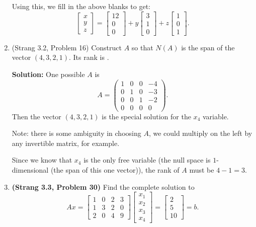 \documentclass[11pt]{article}
\begin{document}
\begin{enumerate}
Using this, we fill in the above blanks to get:
\[\begin{bmatrix} x \\ y \\ z \end{bmatrix} = \begin{bmatrix} 12 \\ 0 \\0 \end{bmatrix} + y\begin{bmatrix} 3 \\ 1 \\ 0 \end{bmatrix} + z \begin{bmatrix} 1 \\ 0 \\ 1 \end{bmatrix}.\]

\item (Strang 3.2, Problem 16)  Construct $A$ so that $N(A)$ is the span of the vector $(4,3,2,1)$.  Its rank is \underline{\phantom{aaaaaaaaaaaaaaaa}}.

\textbf{Solution:} One possible $A$ is
\[ A = \begin{pmatrix} 1 & 0 & 0 &-4 \\ 0 & 1 & 0 & -3 \\ 0  & 0 & 1 & -2 \\ 0& 0 & 0 & 0 \end{pmatrix}. \]
Then the vector $(4,3,2,1)$ is the special solution for the $x_4$ variable.  

Note: there is some ambiguity in choosing $A$, we could multiply on the left by any invertible matrix, for example.

Since we know that $x_4$ is the only free variable (the null space is $1$-dimensional (the span of this one vector)), the rank of $A$ must be $4-1 = 3$.

\item \textbf{(Strang 3.3, Problem 30)} Find the complete solution to 
\[ Ax = \begin{bmatrix} 1 & 0 & 2 & 3 \\ 1 & 3& 2 & 0 \\2 & 0 &4 & 9 \end{bmatrix} \begin{bmatrix} x_1 \\ x_2 \\x_3 \\x_4 \end{bmatrix}= \begin{bmatrix} 2 \\ 5 \\ 10 \end{bmatrix} = b. \]


\end{enumerate}
\end{document}
